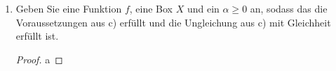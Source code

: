 \documentclass[12pt]{extreport} %
\begin{document}
\begin{enumerate}
		$$ v - \hat{v} \leq \frac{\alpha}{8} w(X)^2 $$
		\begin{proof}
			Da die Voraussetzungen von a) und b) gelten und nach Übung 3.4.1 
			$$ \psi(x) \geq \min_{x \in X} \psi(x) = -\frac{1}{8} w(X)^2, $$
			folgt die Behauptung aus b), indem man 
			$$ g(x) \coloneqq \alpha \psi(x) \quad \forall x \in X $$
			setzt, damit nicht $g(x) \geq -2$ sondern $g(x) \geq \alpha \min_{x \in X} \psi(x) = - \frac{\alpha}{8} w(X)^2$, und da nach Satz 3.4.3 folgt, dass $\hat{f} = f + \psi$ eine konvexe Relaxierung von $f$ auf $X$ ist.
		\end{proof}
	\item Geben Sie eine Funktion $f$, eine Box $X$ und ein $\alpha \geq 0$ an, sodass das die Voraussetzungen aus c) erfüllt und die Ungleichung aus c) mit Gleichheit erfüllt ist.
		\begin{proof}
			a
		\end{proof}
\end{enumerate}
\end{document}

